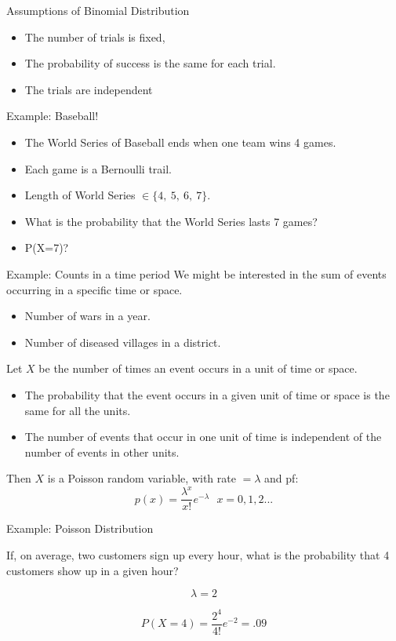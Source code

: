\documentclass[handout]{beamer}
\numberwithin{equation}{section}
\begin{document}
\begin{frame}{Assumptions of Binomial Distribution}
\begin{itemize}
\item The number of trials is fixed,
\item The probability of success is the same for each trial.
\item The trials are independent
\end{itemize}
\end{frame}

\begin{frame}{Example: Baseball!}
\begin{itemize}
\item The World Series of Baseball ends when one team wins 4 games.
\item Each game is a Bernoulli trail.\pause
\item Length of World Series $\in\{4,\ 5,\ 6,\ 7\}$.
\item What is the probability that the World Series lasts 7 games? \pause
\item P(X=7)?
\end{itemize}
\end{frame}



\begin{frame}{Example: Counts in a time period}
We might be interested in the sum of events occurring in a specific time or space.\pause
\begin{itemize}
\item Number of wars in a year.
\item Number of diseased villages in a district.
\end{itemize}
\pause
Let $X$ be the number of times an event occurs in a unit of time or space.
\begin{itemize}
\item The probability that the event occurs in a given unit of time or space is the same for all the units.
\item The number of events that occur in one unit of time is independent of the number of events in other units.
\end{itemize}
\pause
Then $X$ is a Poisson random variable, with rate $= \lambda$ and pf:
$$p(x)=\frac{\lambda^x}{x!} e^{-\lambda}\ \ \ x=0,1,2...$$
\end{frame}

\begin{frame}{Example: Poisson Distribution}

If, on average, two customers sign up every hour, what is the probability that 4 customers show up in a given hour?\pause

$$\lambda=2$$\pause

$$P(X=4)=\frac{2^4}{4!} e^{-2}=.09$$

\end{frame}
\end{document}
